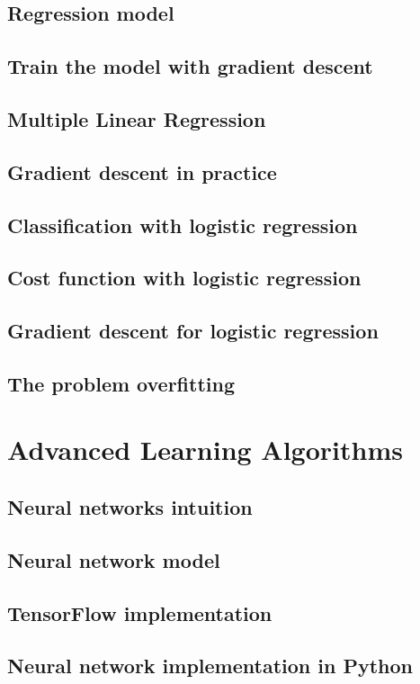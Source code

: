 \documentclass[a4paper, 11pt]{book}
\begin{document}
    \subsection{Regression model}
    \subsection{Train the model with gradient descent}
    \subsection{Multiple Linear Regression}
    \subsection{Gradient descent in practice}
    \subsection{Classification with logistic regression}
    \subsection{Cost function with logistic regression}
    \subsection{Gradient descent for logistic regression}
    \subsection{The problem overfitting}

    \section{Advanced Learning Algorithms}
    \subsection{Neural networks intuition}
    \subsection{Neural network model}
    \subsection{TensorFlow implementation}
    \subsection{Neural network implementation in Python}
\end{document}

